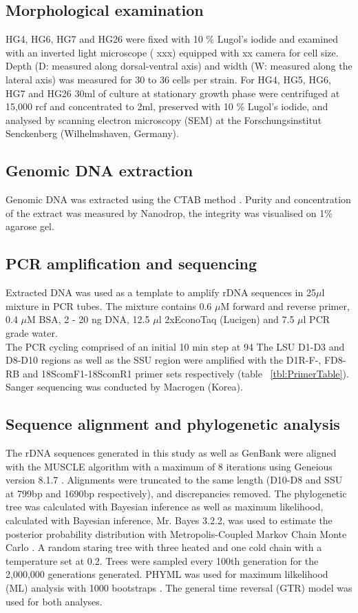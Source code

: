 \documentclass[12pt]{article}
\begin{document}
\subsection{Morphological examination}
HG4, HG6, HG7 and HG26 were fixed with 10 \% Lugol's iodide and examined with an inverted light microscope ( xxx) equipped with xx camera for cell size. Depth (D: measured along dorsal-ventral axis) and width (W: measured along the lateral axis) was measured for 30 to 36 cells per strain.
For HG4, HG5, HG6, HG7 and HG26 30ml of culture at stationary growth phase were centrifuged at 15,000 rcf and concentrated to 2ml, preserved with 10 \% Lugol's iodide, and analysed by scanning electron microscopy (SEM) at the Forschungsinstitut Senckenberg (Wilhelmshaven, Germany).  

\subsection{Genomic DNA extraction}
Genomic DNA was extracted using the CTAB method \cite{zhou1999analysis}. Purity and concentration of the extract was measured by Nanodrop, the integrity was visualised on 1\% agarose gel.

\subsection{PCR amplification and sequencing}
Extracted DNA was used as a template to amplify rDNA sequences in 25$\mu$l mixture in PCR tubes. The mixture contains 0.6 $\mu$M forward and reverse primer, 0.4 $\mu$M BSA, 2 - 20 ng DNA, 12.5 $\mu$l 2xEconoTaq (Lucigen) and 7.5 $\mu$l PCR grade water.\\
The PCR cycling comprised of an initial 10 min step at 94
The LSU D1-D3  and D8-D10 regions as well as the SSU region were amplified with the D1R-F-, FD8-RB and 18ScomF1-18ScomR1 primer sets respectively (table ~\ref{tbl:PrimerTable}).\\
Sanger sequencing was conducted by Macrogen (Korea).


\subsection{Sequence alignment and phylogenetic analysis}
The rDNA sequences generated in this study as well as GenBank were aligned with the MUSCLE algorithm with a maximum of 8 iterations\cite{edgar2004muscle} using Geneious version 8.1.7 \cite{kearse2012geneious}. Alignments were truncated to the same length (D10-D8 and SSU at 799bp and 1690bp respectively), and discrepancies removed.
The phylogenetic tree was calculated with Bayesian inference as well as maximum likelihood, calculated with
Bayesian inference, Mr. Bayes 3.2.2, was used to estimate the posterior probability distribution with Metropolis-Coupled Markov Chain Monte Carlo \cite{ronquist2003mrbayes}. A random staring tree with three heated and one cold chain with a temperature set at 0.2. Trees were sampled every 100th generation for the 2,000,000 generations generated.
PHYML was used for maximum lilkelihood (ML) analysis with 1000 bootstraps \cite{guindon2003simple}.
The general time reversal (GTR) model was used for both analyses.\\
\end{document}
